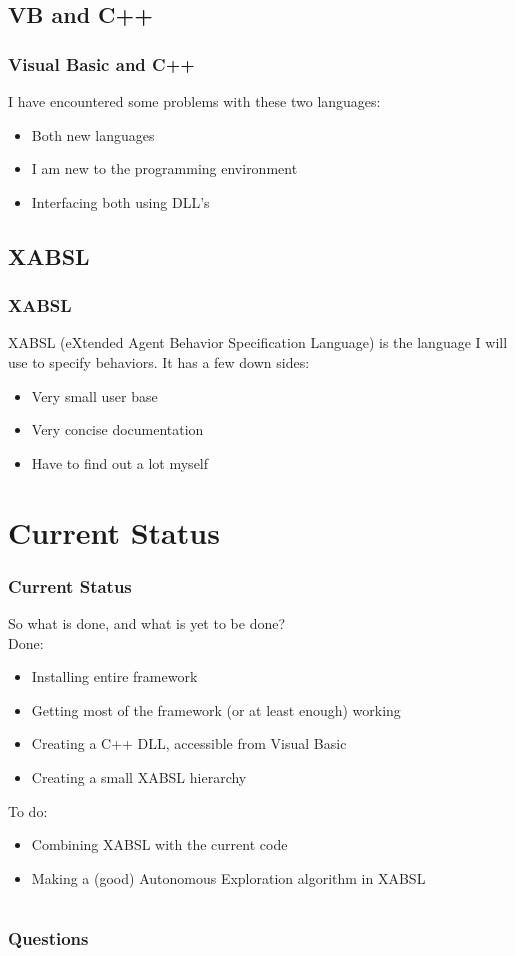 \documentclass{beamer}
\newcommand{\slide}[2]
{
\begin{frame}
\frametitle{#1} 

#2

\end{frame}
}
\begin{document}
\subsection{VB and C++}
\slide{Visual Basic and C++}
{
    I have encountered some problems with these two languages:

    \begin{itemize}
    \item Both new languages
    \item I am new to the programming environment 
    \item Interfacing both using DLL's
    \end{itemize}
}
\subsection{XABSL}
\slide{XABSL}
{
    XABSL (eXtended Agent Behavior Specification Language) is the language I will use to 
    specify behaviors. It has a few down sides:
    \begin{itemize}
        \item Very small user base
        \item Very concise documentation
        \item Have to find out a lot myself
    \end{itemize}
}
\section{Current Status}
\slide{Current Status}
{
    So what is done, and what is yet to be done?\\
    Done:
    \begin{itemize}
        \item Installing entire framework
        \item Getting most of the framework (or at least enough) working
        \item Creating a C++ DLL, accessible from Visual Basic
        \item Creating a small XABSL hierarchy
    \end{itemize}
    To do:
    \begin{itemize}
        \item Combining XABSL with the current code
        \item Making a (good) Autonomous Exploration algorithm in XABSL
    \end{itemize}
}
\section{}
\slide{Questions}
{}
\end{document}
